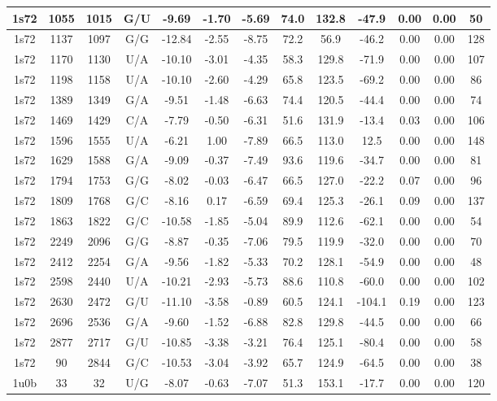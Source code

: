 {\begin{center}
\begin{longtable}{|c|c|c|c|c|c|c|c|c|c|c|c|c|}
1s72 & 1055 & 1015 & G/U & -9.69 & -1.70 & -5.69 & 74.0 & 132.8 & -47.9 & 0.00 & 0.00 & 50 \\ \hline
1s72 & 1137 & 1097 & G/G & -12.84 & -2.55 & -8.75 & 72.2 & 56.9 & -46.2 & 0.00 & 0.00 & 128 \\ \hline
1s72 & 1170 & 1130 & U/A & -10.10 & -3.01 & -4.35 & 58.3 & 129.8 & -71.9 & 0.00 & 0.00 & 107 \\ \hline
1s72 & 1198 & 1158 & U/A & -10.10 & -2.60 & -4.29 & 65.8 & 123.5 & -69.2 & 0.00 & 0.00 & 86 \\ \hline
1s72 & 1389 & 1349 & G/A & -9.51 & -1.48 & -6.63 & 74.4 & 120.5 & -44.4 & 0.00 & 0.00 & 74 \\ \hline
1s72 & 1469 & 1429 & C/A & -7.79 & -0.50 & -6.31 & 51.6 & 131.9 & -13.4 & 0.03 & 0.00 & 106 \\ \hline
1s72 & 1596 & 1555 & U/A & -6.21 & 1.00 & -7.89 & 66.5 & 113.0 & 12.5 & 0.00 & 0.00 & 148 \\ \hline
1s72 & 1629 & 1588 & G/A & -9.09 & -0.37 & -7.49 & 93.6 & 119.6 & -34.7 & 0.00 & 0.00 & 81 \\ \hline
1s72 & 1794 & 1753 & G/G & -8.02 & -0.03 & -6.47 & 66.5 & 127.0 & -22.2 & 0.07 & 0.00 & 96 \\ \hline
1s72 & 1809 & 1768 & G/C & -8.16 & 0.17 & -6.59 & 69.4 & 125.3 & -26.1 & 0.09 & 0.00 & 137 \\ \hline
1s72 & 1863 & 1822 & G/C & -10.58 & -1.85 & -5.04 & 89.9 & 112.6 & -62.1 & 0.00 & 0.00 & 54 \\ \hline
1s72 & 2249 & 2096 & G/G & -8.87 & -0.35 & -7.06 & 79.5 & 119.9 & -32.0 & 0.00 & 0.00 & 70 \\ \hline
1s72 & 2412 & 2254 & G/A & -9.56 & -1.82 & -5.33 & 70.2 & 128.1 & -54.9 & 0.00 & 0.00 & 48 \\ \hline
1s72 & 2598 & 2440 & U/A & -10.21 & -2.93 & -5.73 & 88.6 & 110.8 & -60.0 & 0.00 & 0.00 & 102 \\ \hline
1s72 & 2630 & 2472 & G/U & -11.10 & -3.58 & -0.89 & 60.5 & 124.1 & -104.1 & 0.19 & 0.00 & 123 \\ \hline
1s72 & 2696 & 2536 & G/A & -9.60 & -1.52 & -6.88 & 82.8 & 129.8 & -44.5 & 0.00 & 0.00 & 66 \\ \hline
1s72 & 2877 & 2717 & G/U & -10.85 & -3.38 & -3.21 & 76.4 & 125.1 & -80.4 & 0.00 & 0.00 & 58 \\ \hline
1s72 & 90 & 2844 & G/C & -10.53 & -3.04 & -3.92 & 65.7 & 124.9 & -64.5 & 0.00 & 0.00 & 38 \\ \hline
1u0b & 33 & 32 & U/G & -8.07 & -0.63 & -7.07 & 51.3 & 153.1 & -17.7 & 0.00 & 0.00 & 120 \\ \hline

\end{longtable}
\end{center}}
